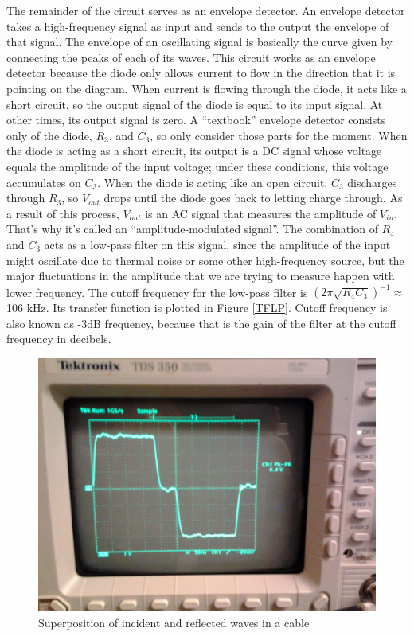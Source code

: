 \documentclass[11pt]{article}
\newcommand{\inv}{^{-1}}
\begin{document}
The remainder of the circuit serves as an envelope detector. An envelope detector
takes a high-frequency signal as input and sends to the output the envelope of that signal.
The envelope of an oscillating signal is basically the curve given by connecting the
peaks of each of its waves. This circuit works as an envelope detector because the diode 
only allows current to flow in the direction that it is pointing on the diagram. When current
is flowing through the diode, it acts like a short
circuit, so the output signal of the diode is equal to its input signal. At other times, its output signal
is zero. A ``textbook'' envelope detector consists only of the diode, $R_3$, and $C_3$, so only
consider those parts for the moment. When the diode is acting as a short circuit, its output
is a DC signal whose voltage equals the amplitude of the input voltage;
under these conditions, this voltage accumulates on $C_3$. When the diode is
acting like an open circuit, $C_3$ discharges through $R_3$, so $V_{out}$ drops until
the diode goes back to letting charge through. As a result of this process, $V_{out}$ is an AC 
signal that measures the amplitude of $V_{in}$. That's why it's called an ``amplitude-modulated signal''. 
The combination of $R_4$ and $C_3$ acts as a low-pass filter on this signal, since the amplitude of the
input might oscillate due to thermal noise or some other high-frequency source, but the major fluctuations
in the amplitude that we are trying to measure happen with lower frequency. The cutoff frequency for the
low-pass filter is $(2\pi\sqrt{R_4C_3})\inv \approx$ 106 kHz. Its transfer function is plotted in Figure \ref{TFLP}.
Cutoff frequency is also known as -3dB frequency, because that is the gain of the filter at the cutoff frequency
in decibels.
\begin{figure}
\centering
\includegraphics[scale=0.2]{reflection}
\caption{Superposition of incident and reflected waves in a cable \label{SUPER}}
\end{figure}
\end{document}
